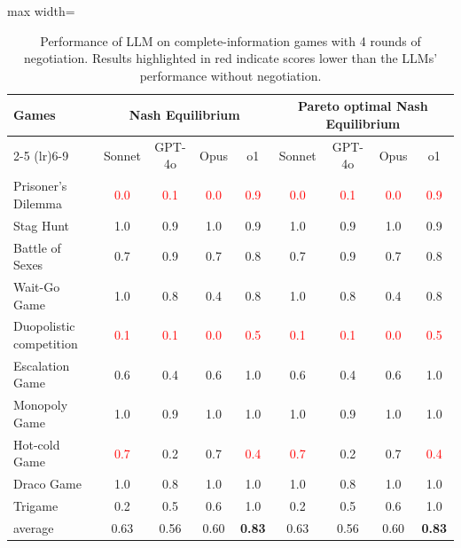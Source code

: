 \begin{table}[!ht]
    \centering
    \begin{adjustbox}{max width=\textwidth}
    \begin{tabular}{lc c c c c c c c}
    \toprule
        \multirow{2.5}{*}{\textbf{Games}} & \multicolumn{4}{c}{\bf Nash Equilibrium} & \multicolumn{4}{c}{\bf Pareto optimal Nash Equilibrium} \\ \cmidrule(lr){2-5}  \cmidrule(lr){6-9} 
           & Sonnet & GPT-4o & Opus & o1 & Sonnet & GPT-4o & Opus & o1  \\
        \midrule 
        Prisoner's Dilemma & \textcolor{red}{0.0} & \textcolor{red}{0.1} & \textcolor{red}{0.0} & \textcolor{red}{0.9} & \textcolor{red}{0.0} & \textcolor{red}{0.1} & \textcolor{red}{0.0} & \textcolor{red}{0.9} \\
        Stag Hunt & 1.0 & 0.9 & 1.0 & 0.9 & 1.0 & 0.9 & 1.0 & 0.9\\
        Battle of Sexes& 0.7 & 0.9 & 0.7 & 0.8 & 0.7 & 0.9 & 0.7 & 0.8\\
        Wait-Go Game & 1.0 & 0.8 & 0.4 & 0.8 & 1.0 & 0.8 & 0.4 & 0.8\\
        Duopolistic competition & \textcolor{red}{0.1} & \textcolor{red}{0.1} & \textcolor{red}{0.0} & \textcolor{red}{0.5} & \textcolor{red}{0.1} & \textcolor{red}{0.1} & \textcolor{red}{0.0} & \textcolor{red}{0.5}\\
        Escalation Game & 0.6 & 0.4 & 0.6 & 1.0 & 0.6 & 0.4 & 0.6 & 1.0\\
        Monopoly Game & 1.0 & 0.9 & 1.0 & 1.0 & 1.0 & 0.9 & 1.0 & 1.0\\
        Hot-cold Game & \textcolor{red}{0.7} & 0.2 & 0.7 & \textcolor{red}{0.4} & \textcolor{red}{0.7} & 0.2 & 0.7 & \textcolor{red}{0.4}\\
        Draco Game & 1.0 & 0.8 & 1.0 & 1.0 & 1.0 & 0.8 & 1.0 & 1.0\\
        Trigame & 0.2 & 0.5 & 0.6 & 1.0 & 0.2 & 0.5 & 0.6 & 1.0\\
        \midrule
        average & 0.63 & 0.56 & 0.60 & \textbf{0.83} & 0.63 & 0.56 & 0.60 & \textbf{0.83}\\
        \bottomrule
    \end{tabular}
    \end{adjustbox}
    \caption{Performance of LLM on complete-information games with 4 rounds of negotiation. Results highlighted in red indicate scores lower than the LLMs' performance without negotiation.}
    \label{tab:classic_w_neg_wo_wf}
\end{table}

